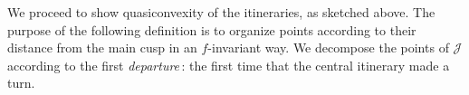 \begin{comment}
\begin{proof}
The idea is that peripheral tracks never turn twice in the same direction, so cannot approach the cusp $p$ in a parabolic manner. Thus at large scales the length decays by a definite factor, and by the self-similarity of itineraries the same happens in the small-scale.
To make this rigorous, consider first the set $\Gamma_{\downarrow \downarrow \downarrow}$ of reduced tracks that start at the main station $s_{0,0}$ with at least three consecutive express tracks. Take a neighborhood $N$ of the union of all those tracks on which $f$ is univalent. %
For every station $s$, the corresponding family $\Gamma^s_{\downarrow \downarrow \downarrow}$ of tracks starting at $s$ is the preimage of $\Gamma_{\downarrow \downarrow \downarrow}$  under some branch of an iterate of $f^{-1}$ which maps the main station $s_{0,0}$ to $s$.
Koebe's distortion theorem on this branch gives that
\begin{equation}
\diam(\shadow(s)) \asymp \dist (s,\mathcal J) \asymp \diam (N_s) \asymp \min_{\gamma \in \Gamma^s_{\downarrow \downarrow \downarrow}} \Length(\gamma)
\end{equation}
where $N_s$ is the preimage of $N$. Thus the length of $\eta_j$ decays at the same rate as $\dist(s,\mathcal J)$. %

We used the assumption that the itinerary starts with at least three express tracks in order to have the neighborhood $N$. For itineraries that do not start with three consecutive express tracks, we consider separately the family $\Gamma_{\downarrow \downarrow \leftarrow}$ of those itineraries which start with two express tracks followed by a left itinerary, and the similarly-defined $\Gamma_{\downarrow \downarrow \rightarrow}$. For each of these families the previous argument holds since there is such a neighborhood $N$ of univalence.
\end{proof}
The shadows were not strictly necessary for the preceding proof, but they draw an analogy with similar estimates for the Farey tesselation of the disk.
\end{comment}

We proceed to show quasiconvexity of the itineraries, as sketched above. The purpose of the following definition is to organize points according to their distance from the main cusp in an $f$-invariant way. We decompose the points of $\mathcal J$ according to the first \emph{departure}\,: the first time that the central itinerary made a turn.


